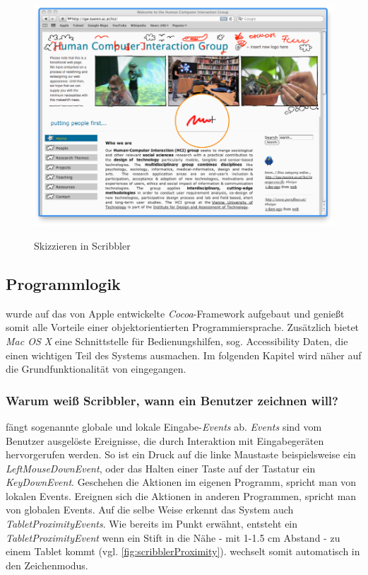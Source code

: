 \begin{figure}
        {\includegraphics[width=1\linewidth]{gfx/scribblerSketching}}
		\caption[Skizzieren in Scribbler]{Skizzieren in Scribbler}\label{fig:scribblerSketching}
\end{figure}

\subsection{Programmlogik} \label{sec:programmLogik} 
\scribbler wurde auf das von Apple entwickelte \emph{Cocoa}-Framework aufgebaut und genießt somit alle Vorteile einer objektorientierten Programmiersprache. Zusätzlich bietet \emph{Mac OS X} eine Schnittstelle für Bedienungshilfen, sog. Accessibility Daten, die einen wichtigen Teil des Systems ausmachen. Im folgenden Kapitel wird näher auf die Grundfunktionalität von \scribbler eingegangen.

\subsubsection* {Warum weiß Scribbler, wann ein Benutzer zeichnen will?}
\scribbler fängt sogenannte globale und lokale Eingabe-\emph{Events} ab. \emph{Events} sind vom Benutzer ausgelöste Ereignisse, die durch Interaktion mit Eingabegeräten hervorgerufen werden. So ist ein Druck auf die linke Maustaste beispielsweise ein \emph{LeftMouseDownEvent}, oder das Halten einer Taste auf der Tastatur ein \emph{KeyDownEvent}. Geschehen die Aktionen im eigenen Programm, spricht man von lokalen Events. Ereignen sich die Aktionen in anderen Programmen, spricht man von globalen Events. Auf die selbe Weise erkennt das System auch \emph{TabletProximityEvents}. Wie bereits im Punkt  erwähnt, entsteht ein \emph{TabletProximityEvent} wenn ein Stift in die Nähe - mit 1-1.5 cm Abstand - zu einem Tablet kommt (vgl. \autoref{fig:scribblerProximity}). \scribbler wechselt somit automatisch in den Zeichenmodus. 

